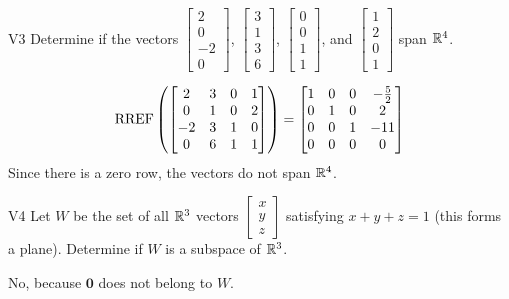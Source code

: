 \documentclass{sbgLAexam}
\begin{document}
\begin{extract}\newpage\end{extract}
\begin{problem}{V3}
Determine if the vectors $\begin{bmatrix} 2 \\ 0 \\ -2 \\ 0 \end{bmatrix}$, $\begin{bmatrix} 3 \\ 1 \\ 3 \\ 6 \end{bmatrix}$, $\begin{bmatrix} 0 \\ 0 \\ 1 \\ 1 \end{bmatrix}$, and $\begin{bmatrix}1 \\ 2 \\ 0 \\ 1 \end{bmatrix}$ span $\mathbb{R}^4$.
\end{problem}
\begin{solution}
$$\operatorname{RREF}\left( \begin{bmatrix} 2 & 3 & 0 & 1 \\ 0 & 1 & 0 & 2 \\ -2 & 3 & 1 & 0 \\ 0 & 6 & 1 & 1\end{bmatrix} \right) = \begin{bmatrix}1 & 0 & 0 & -\frac{5}{2} \\ 0 & 1 & 0 & 2 \\ 0 & 0 & 1 & -11\\ 0 & 0 & 0 & 0  \end{bmatrix} $$
Since there is a zero row, the vectors do not span $\mathbb{R}^4$.
\end{solution}

\begin{problem}{V4} Let \(W\) be the set of all \(\mathbb{R}^3\) vectors
\(\begin{bmatrix} x \\ y \\ z \end{bmatrix}\)
satisfying \(x+y+z=1\) (this forms a plane).
Determine if \(W\) is a subspace of \(\mathbb{R}^3\).
\end{problem}
\begin{solution}
No, because \(\mathbf{0}\) does not belong to \(W\).
\end{solution}
\end{document}
